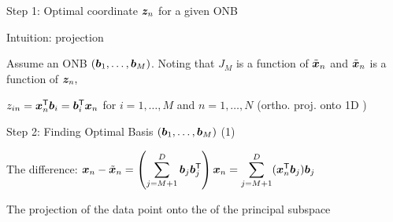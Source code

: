\documentclass[handout,fleqn,aspectratio=169]{beamer}
\begin{document}
\begin{frame}{Step 1: Optimal coordinate $\bm{z}_n$ for a given ONB}

\plitemsep 0.03in

\bci

\item Intuition:  projection \hfill {} 
\item {}
Assume an ONB $(\bm{b}_1, \ldots, \bm{b}_M)$. Noting that $J_M$ is a function of $\tilde{\bm{x}}_n$ and $\tilde{\bm{x}}_n$ is a function of $\bm{z}_n,$
\vspace{-0.3cm}
\small
{}
\item $z_{in} = {\bm{x}}^{\mathsf{T}}_n \bm{b}_i = {\bm{b}}^{\mathsf{T}}_i \bm{x}_n$ for $i=1, \ldots, M$ and $n=1, \ldots, N$  \hfill (ortho. proj. onto 1D )
\eci
\end{frame}

\begin{frame}{Step 2: Finding Optimal Basis $(\bm{b}_1, \ldots, \bm{b}_M)$ (1)}

\plitemsep 0.1in

\bci

\item The difference: $\displaystyle \bm{x}_n - \tilde{\bm{x}}_n = \left(\sum_{j=M+1}^D \bm{b}_j {\bm{b}}^{\mathsf{T}}_j \right) \bm{x}_n = \sum_{j=M+1}^D ({\bm{x}}^{\mathsf{T}}_n \bm{b}_j)\bm{b}_j$


\item The projection of the data point onto the  of the principal subspace \hfill {}
\eci
\end{frame}
\end{document}
